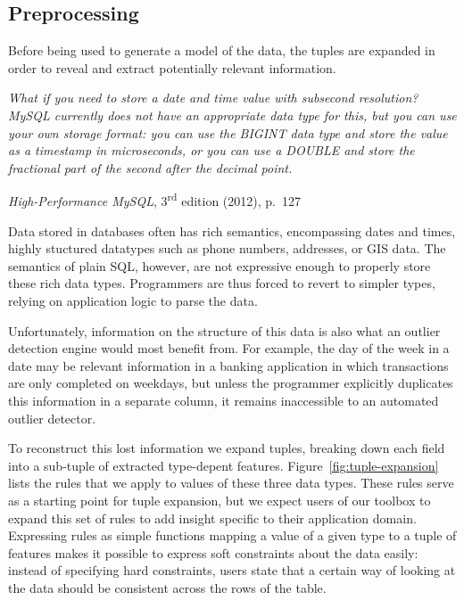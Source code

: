 \subsection{Preprocessing}
\label{sec:preprocessing}

Before being used to generate a model of the data, the tuples are expanded in order to reveal and extract potentially relevant information.

\noindent
\begin{minipage}{\linewidth}
  \begin{minipage}{0.8\linewidth}
    \itshape
    What if you need to store a date and time value with subsecond resolution? MySQL
    currently does not have an appropriate data type for this, but you can use your own
    storage format: you can use the BIGINT data type and store the value as a timestamp in
    microseconds, or you can use a DOUBLE and store the fractional part of the second after
    the decimal point.
  \end{minipage}
  \begin{flushright}
    \textit{High-Performance MySQL}, 3\textsuperscript{rd} edition (2012), p.~127
  \end{flushright}
\end{minipage}\vspace{\figurepadding}

Data stored in databases often has rich semantics, encompassing dates and times, highly stuctured datatypes such as phone numbers, addresses, or GIS data. The semantics of plain SQL, however, are not expressive enough to properly store these rich data types. Programmers are thus forced to revert to simpler types, relying on application logic to parse the data.

Unfortunately, information on the structure of this data is also what an outlier detection engine would most benefit from. For example, the day of the week in a date may be relevant information in a banking application in which transactions are only completed on weekdays, but unless the programmer explicitly duplicates this information in a separate column, it remains inaccessible to an automated outlier detector.

To reconstruct this lost information we expand tuples, breaking down each field into a sub-tuple of extracted type-depent features. Figure~\ref{fig:tuple-expansion} lists the rules that we apply to values of these three data types. These rules serve as a starting point for tuple expansion, but we expect users of our toolbox to expand this set of rules to add insight specific to their application domain. Expressing rules as simple functions mapping a value of a given type to a tuple of features makes it possible to express soft constraints about the data easily: instead of specifying hard constraints, users state that a certain way of looking at the data should be consistent across the rows of the table.

